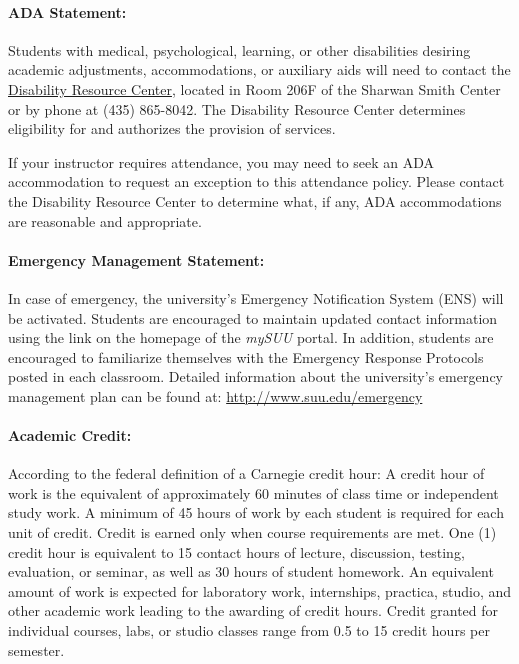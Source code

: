 \documentclass[12pt, letterpaper]{article}
\begin{document}
\paragraph{ADA Statement:}
Students with medical, psychological, learning, or other disabilities desiring academic adjustments, accommodations, or auxiliary aids will need to contact the \href{https://www.suu.edu/disabilityservices/}{Disability Resource Center}, located in Room 206F of the Sharwan Smith Center or by phone at (435) 865-8042. The Disability Resource Center determines eligibility for and authorizes the provision of services.

\noindent
If your instructor requires attendance, you may need to seek an ADA accommodation to request an exception to this attendance policy. Please contact the Disability Resource Center to determine what, if any, ADA accommodations are reasonable and appropriate.

\paragraph{Emergency Management Statement:}
In case of emergency, the university's Emergency Notification System (ENS) will be activated. Students are encouraged to maintain updated contact information using the link on the homepage of the \emph{mySUU} portal. In addition, students are encouraged to familiarize themselves with the Emergency Response Protocols posted in each classroom. Detailed information about the university's emergency management plan can be found at: \href{http://www.suu.edu/emergency}{http://www.suu.edu/emergency}

\paragraph{Academic Credit:}
According to the federal definition of a Carnegie credit hour: A credit hour of work is the equivalent of approximately 60 minutes of class time or independent study work. A minimum of 45 hours of work by each student is required for each unit of credit. Credit is earned only when course requirements are met. One (1) credit hour is equivalent to 15 contact hours of lecture, discussion, testing, evaluation, or seminar, as well as 30 hours of student homework. An equivalent amount of work is expected for laboratory work, internships, practica, studio, and other academic work leading to the awarding of credit hours. Credit granted for individual courses, labs, or studio classes range from 0.5 to 15 credit hours per semester.
\end{document}
